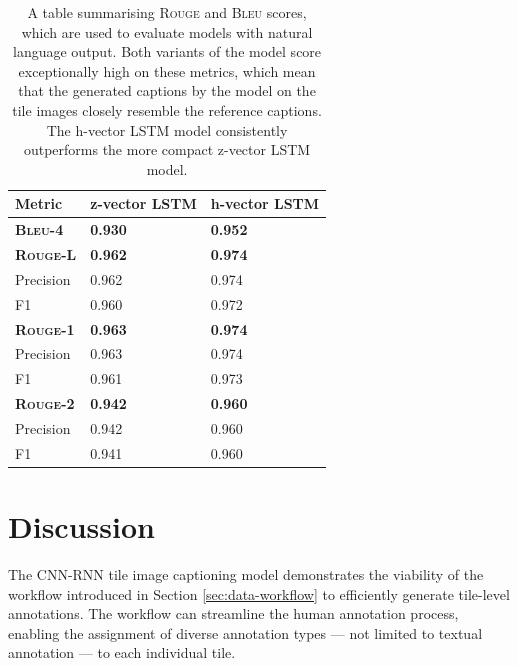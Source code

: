 \documentclass{l4proj}
\begin{document}
\begin{table}[]
\centering
\caption{A table summarising \textsc{Rouge} and \textsc{Bleu} scores, which are used to evaluate models with natural language output. Both variants of the model score exceptionally high on these metrics, which mean that the generated captions by the model on the tile images closely resemble the reference captions. The h-vector LSTM model consistently outperforms the more compact z-vector LSTM model.}
\label{tab:text-metrics}
\begin{tabular}{@{}lll@{}}
\textbf{Metric}           & \textbf{z-vector LSTM} & \textbf{h-vector LSTM} \\ \midrule
\textbf{\textsc{Bleu-4}}  & \textbf{0.930}               & \textbf{0.952}                \\ \rule{0pt}{3ex}
\textbf{\textsc{Rouge-L}} & \textbf{0.962}               & \textbf{0.974}                \\
Precision                 & 0.962                        & 0.974                         \\
F1                        & 0.960                        & 0.972                         \\ \rule{0pt}{3ex}
\textbf{\textsc{Rouge-1}} & \textbf{0.963}               & \textbf{0.974}                \\
Precision                 & 0.963                        & 0.974                         \\
F1                        & 0.961                        & 0.973                         \\ \rule{0pt}{3ex}
\textbf{\textsc{Rouge-2}} & \textbf{0.942}               & \textbf{0.960}                \\
Precision                 & 0.942                        & 0.960                         \\
F1                        & 0.941                        & 0.960                        
\end{tabular}
\end{table}

\section{Discussion} \label{sec:caption-discussion}
The CNN-RNN tile image captioning model demonstrates the viability of the workflow introduced in Section \ref{sec:data-workflow} to efficiently generate tile-level annotations. The workflow can streamline the human annotation process, enabling the assignment of diverse annotation types --- not limited to textual annotation --- to each individual tile.
\end{document}

